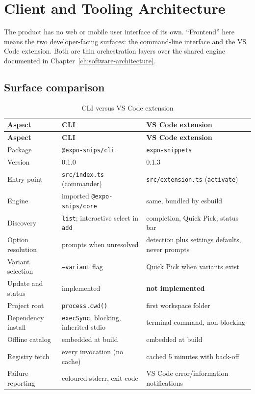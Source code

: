 \chapter{Client and Tooling Architecture}
\label{ch:frontend-architecture}

The product has no web or mobile user interface of its own. ``Frontend'' here
means the two developer-facing surfaces: the command-line interface and the VS Code
extension. Both are thin orchestration layers over the shared engine documented in
Chapter~\ref{ch:software-architecture}.

\section{Surface comparison}

\begin{longtable}{@{}L{3.4cm}L{4.6cm}L{5.8cm}@{}}
\caption{CLI versus VS Code extension}\\
\toprule
\textbf{Aspect} & \textbf{CLI} & \textbf{VS Code extension} \\
\midrule
\endfirsthead
\toprule
\textbf{Aspect} & \textbf{CLI} & \textbf{VS Code extension} \\
\midrule
\endhead
Package & \texttt{@expo-snips/cli} & \texttt{expo-snippets} \\
Version & 0.1.0 & 0.1.3 \\
Entry point & \texttt{src/index.ts} (commander) & \texttt{src/extension.ts} (\texttt{activate}) \\
Engine & imported \texttt{@expo-snips/core} & same, bundled by esbuild \\
Discovery & \texttt{list}; interactive select in \texttt{add} & completion, Quick Pick, status bar \\
Option resolution & prompts when unresolved & detection plus settings defaults, never prompts \\
Variant selection & \texttt{--variant} flag & Quick Pick when variants exist \\
Update and status & implemented & \textbf{not implemented} \\
Project root & \texttt{process.cwd()} & first workspace folder \\
Dependency install & \texttt{execSync}, blocking, inherited stdio & terminal command, non-blocking \\
Offline catalog & embedded at build & embedded at build \\
Registry fetch & every invocation (no cache) & cached 5 minutes with back-off \\
Failure reporting & coloured stderr, exit code & VS Code error/information notifications \\
\bottomrule
\end{longtable}

